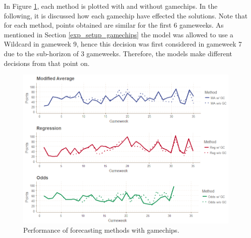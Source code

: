 \begin{table}[H]
\centering
{}
\caption{Results including gamechips.}
\label{tab:res_incl_gamechips}
\end{table}



In Figure \ref{fig:res_comp_gamechips}, each method is plotted with and without gamechips. In the following, it is discussed how each gamechip have effected the solutions. Note that for each method, points obtained are similar for the first 6 gameweeks. As mentioned in Section \ref{exp_setup_gamechips} the model was allowed to use a Wildcard in gameweek 9, hence this decision was first considered in gameweek 7 due to the sub-horizon of 3 gameweeks. Therefore, the models make different decisions from that point on.

\begin{figure}[H]
    \centering
    \includegraphics[scale=0.5]{fig/chapter_7/w_wo_gc_all.png}
    \caption{Performance of forecasting methods with gamechips.}
\label{fig:res_comp_gamechips}    
\end{figure}



